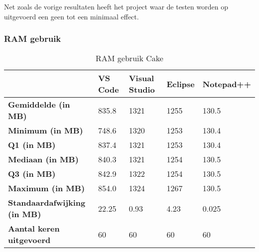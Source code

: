 Net zoals de vorige resultaten heeft het project waar de testen worden op uitgevoerd een geen tot een minimaal effect.

\newpage

\subsubsection{RAM gebruik}
\begin{table}[h]
	\centering
	\begin{tabular}{ l l l l l }
		\hline
		                                    & \textbf{VS Code} & \textbf{Visual Studio} & \textbf{Eclipse} & \textbf{Notepad++} \\
		\hline
		\textbf{Gemiddelde (in MB)}         & 835.8            & 1321                   & 1255             & 130.5              \\[1ex]

		\textbf{Minimum (in MB) }           & 748.6            & 1320                   & 1253             & 130.4              \\
		\textbf{Q1 (in MB)}                 & 837.4            & 1321                   & 1253             & 130.4              \\
		\textbf{Mediaan (in MB)}            & 840.3            & 1321                   & 1254             & 130.5              \\
		\textbf{Q3 (in MB)}                 & 842.9            & 1322                   & 1254             & 130.5              \\
		\textbf{Maximum (in MB)}            & 854.0            & 1324                   & 1267             & 130.5              \\[1ex]

		\textbf{Standaardafwijking (in MB)} & 22.25            & 0.93                   & 4.23             & 0.025              \\
		\textbf{Aantal keren uitgevoerd}    & 60               & 60                     & 60               & 60                 \\
		\hline
	\end{tabular}
	\caption{RAM gebruik Cake}
	\label{tab:resultatenRAMCake}
\end{table}

